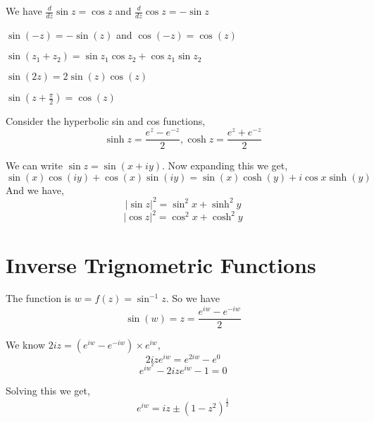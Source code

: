 We have $\frac{d}{dz} \sin z = \cos z$ and $\frac{d}{dz} \cos z = -\sin z$
 
\begin{property}
   $\sin(-z) = -\sin(z)$ and $\cos(-z) = \cos(z)$
\end{property}
\begin{property}
   $\sin(z_1 + z_2) = \sin z_1 \cos z_2 + \cos z_1 \sin z_2 $
\end{property}
\begin{property}
   $\sin(2z) = 2 \sin(z)\cos(z)$
\end{property}
\begin{property}
   $\sin(z + \frac{\pi}{2}) = \cos(z)$
\end{property}


Consider the hyperbolic sin and cos functions,$$\sinh z = \frac{e^{z} - e^{-z}}{2}, \cosh z = \frac{e^{z} + e^{-z}}{2}$$

We can write $\sin z = \sin(x + iy)$. Now expanding this we get,  
$$ \sin(x)\cos(iy) + \cos(x)\sin(iy) = \sin(x) \cosh(y) + i\cos x \sinh(y)$$ 
And we have, 
$$ |\sin z|^2 = \sin^2 x + \sinh^2 y $$ 
$$ |\cos z|^2 = \cos^2 x + \cosh^2 y $$ 




\section{Inverse Trignometric Functions}
The function is $w = f(z) = \sin^{-1}z$. So we have $$\sin(w) = z = \frac{e^{iw} - e^{-iw}}{2}$$

We know $2iz = (e^{iw} -  e^{-iw}) \times  e^{iw}$, 
$$ 2iz e^{iw}= e^{2iw} - e^{0} $$ 
$$ e^{iw}^2 - 2ize^{iw} - 1 = 0 $$

Solving this we get, 
$$ e^{iw} = iz \pm (1-z^2)^{\frac{1}{2}} $$ 




